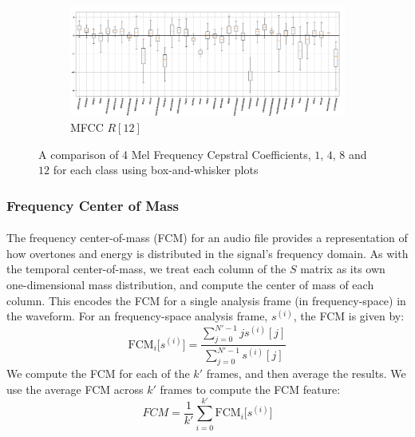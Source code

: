 \documentclass[12pt,letterpaper]{article}
\begin{document}
\begin{figure}[H]
\begin{center}
	\begin{subfigure}{1.0\textwidth}
	\centering
	\includegraphics[width=\textwidth , height=0.2\textheight]
		{../FiguresFeatures/MFCC_12}
	\caption{MFCC $R[12]$}
	\end{subfigure}	

\end{center}
\caption{A comparison of 4 Mel Frequency Cepstral Coefficients, $1$, $4$, $8$ and $12$ for each class using box-and-whisker plots}
\label{fig-FeatureMFCCs}
\end{figure}


\subsubsection{Frequency Center of Mass}

\paragraph*{}The frequency center-of-mass (FCM) for an audio file provides a representation of how overtones and energy is distributed in the signal's frequency domain. As with the temporal center-of-mass, we treat each column of the $S$ matrix as its own one-dimensional mass distribution, and compute the center of mass of each column. This encodes the FCM for a single analysis frame (in frequency-space) in the waveform. For an frequency-space analysis frame, $s^{(i)}$, the FCM is given by:
\begin{equation}
\label{eqn-FeatureFCM}
\text{FCM}_{i}\big[ s^{(i)} \big] = \frac{\sum_{j=0}^{N'-1}j s^{(i)}[j]}{\sum_{j=0}^{N'-1}s^{(i)}[j]}
\end{equation}
We compute the FCM for each of the $k'$ frames, and then average the results. We use the average FCM across $k'$ frames to compute the FCM feature:
\begin{equation}
FCM = \frac{1}{k'}\sum_{i=0}^{k'}\text{FCM}_{i}\big[ s^{(i)} \big]
\end{equation}
\end{document}
